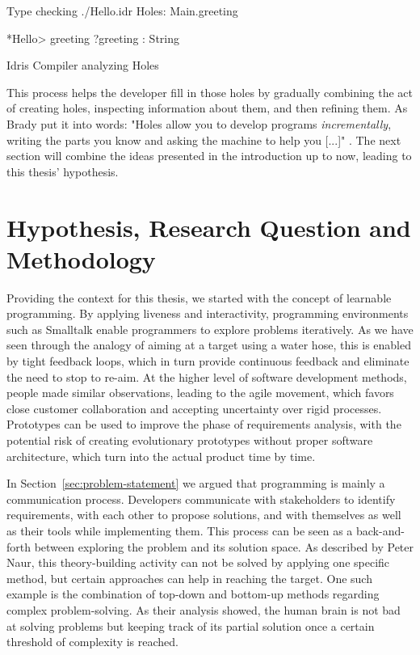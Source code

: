 \begin{program}
\begin{GenericCode}
Type checking ./Hello.idr
Holes: Main.greeting

*Hello> greeting
?greeting : String
\end{GenericCode}
\caption{Idris Compiler analyzing Holes}
\label{fig:idris-compiler-holes}
\end{program}

This process helps the developer fill in those holes by gradually combining the act of creating holes, inspecting information about them, and then refining them.
As Brady put it into words: "Holes allow you to develop programs \emph{incrementally}, writing the parts you know and asking the machine to help you [...]" \cite{brady_type-driven_2017}.
The next section will combine the ideas presented in the introduction up to now, leading to this thesis' hypothesis.


\section{Hypothesis, Research Question and Methodology}
\label{sec:hypothesis}
Providing the context for this thesis, we started with the concept of learnable programming.
By applying liveness and interactivity, programming environments such as Smalltalk enable programmers to explore problems iteratively.
As we have seen through the analogy of aiming at a target using a water hose, this is enabled by tight feedback loops, which in turn provide continuous feedback and eliminate the need to stop to re-aim.
At the higher level of software development methods, people made similar observations, leading to the agile movement, which favors close customer collaboration and accepting uncertainty over rigid processes.
Prototypes can be used to improve the phase of requirements analysis, with the potential risk of creating evolutionary prototypes without proper software architecture, which turn into the actual product time by time.

In Section~\ref{sec:problem-statement} we argued that programming is mainly a communication process.
Developers communicate with stakeholders to identify requirements, with each other to propose solutions, and with themselves as well as their tools while implementing them.
This process can be seen as a back-and-forth between exploring the problem and its solution space.
As described by Peter Naur, this theory-building activity can not be solved by applying one specific method, but certain approaches can help in reaching the target.
One such example is the combination of top-down and bottom-up methods regarding complex problem-solving.
As their analysis showed, the human brain is not bad at solving problems but keeping track of its partial solution once a certain threshold of complexity is reached.

